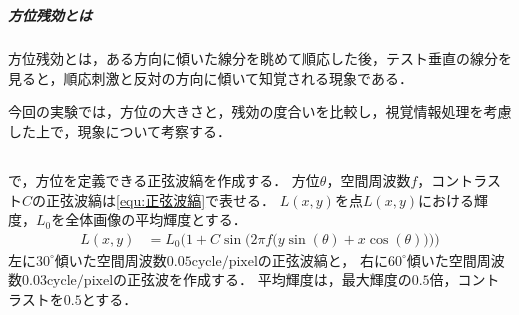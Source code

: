 \chapter{\kadaic}
\section{\purpose}
\paragraph{方位残効とは}
方位残効とは，ある方向に傾いた線分を眺めて順応した後，テスト垂直の線分を見ると，順応刺激と反対の方向に傾いて知覚される現象である\cite[p.5]{方位残効と運動残効のメカニズム}．\par
今回の実験では，方位の大きさと，残効の度合いを比較し，視覚情報処理を考慮した上で，現象について考察する．
\section{\method}
\paragraph{\kadaica}
\matlab で，方位を定義できる正弦波縞を作成する．
方位\(\theta\)，空間周波数\(f\)，コントラスト\(C\)の正弦波縞は\eqref{equ:正弦波縞}で表せる．
\(L(x,y)\)を点\(L(x,y)\)における輝度，\(L_0\)を全体画像の平均輝度とする．
\begin{align}
    L(x,y) & = L_0\Bigg(1+C\sin\Big(2\pi f\big(y\sin(\theta)+x\cos(\theta)\big)\Big)\Bigg)\label{equ:正弦波縞}
\end{align}
左に\(30^\circ\)傾いた空間周波数\(0.05\textrm{cycle}/\textrm{pixel}\)の正弦波縞と，
右に\(60^{\circ}\)傾いた空間周波数\(0.03\textrm{cycle}/\textrm{pixel}\)の正弦波を作成する．
平均輝度は，最大輝度の\(0.5\)倍，コントラストを\(0.5\)とする．
